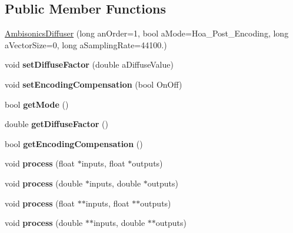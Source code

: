 \subsection*{Public Member Functions}
\begin{DoxyCompactItemize}
\item 
\hyperlink{class_ambisonics_diffuser_a3cb3d33fc7fc15d85b337860c2a0fc34}{Ambisonics\-Diffuser} (long an\-Order=1, bool a\-Mode=Hoa\-\_\-\-Post\-\_\-\-Encoding, long a\-Vector\-Size=0, long a\-Sampling\-Rate=44100.)
\item 
\hypertarget{class_ambisonics_diffuser_afdd0d434a6cb43eb3e47f972e493f2c4}{void {\bfseries set\-Diffuse\-Factor} (double a\-Diffuse\-Value)}\label{class_ambisonics_diffuser_afdd0d434a6cb43eb3e47f972e493f2c4}

\item 
\hypertarget{class_ambisonics_diffuser_ab05839b199ddb9f92b8f1948e5970b06}{void {\bfseries set\-Encoding\-Compensation} (bool On\-Off)}\label{class_ambisonics_diffuser_ab05839b199ddb9f92b8f1948e5970b06}

\item 
\hypertarget{class_ambisonics_diffuser_a2c850e27e326b129603d40efb12357ee}{bool {\bfseries get\-Mode} ()}\label{class_ambisonics_diffuser_a2c850e27e326b129603d40efb12357ee}

\item 
\hypertarget{class_ambisonics_diffuser_a2ac77f3c5d9639f956069dc1ae5bc0e5}{double {\bfseries get\-Diffuse\-Factor} ()}\label{class_ambisonics_diffuser_a2ac77f3c5d9639f956069dc1ae5bc0e5}

\item 
\hypertarget{class_ambisonics_diffuser_ad43d03bf998b4d8a2995a25f2ff63d46}{bool {\bfseries get\-Encoding\-Compensation} ()}\label{class_ambisonics_diffuser_ad43d03bf998b4d8a2995a25f2ff63d46}

\item 
\hypertarget{class_ambisonics_diffuser_a2c02b3301030cede803a7509c5d6a08e}{void {\bfseries process} (float $\ast$inputs, float $\ast$outputs)}\label{class_ambisonics_diffuser_a2c02b3301030cede803a7509c5d6a08e}

\item 
\hypertarget{class_ambisonics_diffuser_a628e553a0e671905c1d2f5e1616a7301}{void {\bfseries process} (double $\ast$inputs, double $\ast$outputs)}\label{class_ambisonics_diffuser_a628e553a0e671905c1d2f5e1616a7301}

\item 
\hypertarget{class_ambisonics_diffuser_ae88b27ffc2b084b7ad65e3710e9f7b8a}{void {\bfseries process} (float $\ast$$\ast$inputs, float $\ast$$\ast$outputs)}\label{class_ambisonics_diffuser_ae88b27ffc2b084b7ad65e3710e9f7b8a}

\item 
\hypertarget{class_ambisonics_diffuser_a6362f16732794b5298eead6c94b26cb2}{void {\bfseries process} (double $\ast$$\ast$inputs, double $\ast$$\ast$outputs)}\label{class_ambisonics_diffuser_a6362f16732794b5298eead6c94b26cb2}

\end{DoxyCompactItemize}
